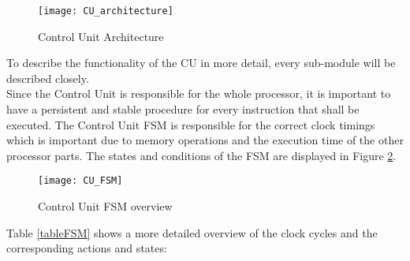 \begin{figure}[H]
	\centering
	\texttt{[image: CU\_architecture]}
	\caption{Control Unit Architecture}
	\label{fig:cuarchitecture}
\end{figure}

To describe the functionality of the CU in more detail, every sub-module will be described closely.\\
Since the Control Unit is responsible for the whole processor, it is important to have a persistent and stable procedure for every instruction that shall be executed. The Control Unit \ac{FSM} is responsible for the correct clock timings which is important due to memory operations and the execution time of the other processor parts. The states and conditions of the FSM are displayed in Figure \ref{fig:cufsm}. 

\begin{figure}[H]
	\centering
	\texttt{[image: CU\_FSM]}
	\caption{Control Unit FSM overview}
	\label{fig:cufsm}
\end{figure}

Table \ref{tableFSM} shows a more detailed overview of the clock cycles and the corresponding actions and states:\\

\begin{table}[h]
\setlength\arrayrulewidth{2pt}	
\caption{Timing of FSM}
\label{tableFSM}
\end{table}


